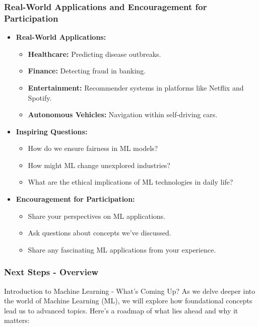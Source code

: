 \documentclass[aspectratio=169]{beamer}
\begin{document}
\begin{frame}[fragile]
    \frametitle{Real-World Applications and Encouragement for Participation}

    \begin{itemize}
        \item \textbf{Real-World Applications:}
        \begin{itemize}
            \item \textbf{Healthcare:} Predicting disease outbreaks.
            \item \textbf{Finance:} Detecting fraud in banking.
            \item \textbf{Entertainment:} Recommender systems in platforms like Netflix and Spotify.
            \item \textbf{Autonomous Vehicles:} Navigation within self-driving cars.
        \end{itemize}
        \item \textbf{Inspiring Questions:}
        \begin{itemize}
            \item How do we ensure fairness in ML models?
            \item How might ML change unexplored industries?
            \item What are the ethical implications of ML technologies in daily life?
        \end{itemize}
        \item \textbf{Encouragement for Participation:}
        \begin{itemize}
            \item Share your perspectives on ML applications.
            \item Ask questions about concepts we’ve discussed.
            \item Share any fascinating ML applications from your experience.
        \end{itemize}
    \end{itemize}
\end{frame}

\begin{frame}[fragile]
    \frametitle{Next Steps - Overview}
    \begin{block}{Introduction to Machine Learning - What's Coming Up?}
        As we delve deeper into the world of Machine Learning (ML), we will explore how foundational concepts lead us to advanced topics. Here’s a roadmap of what lies ahead and why it matters:
    \end{block}
\end{frame}
\end{document}
